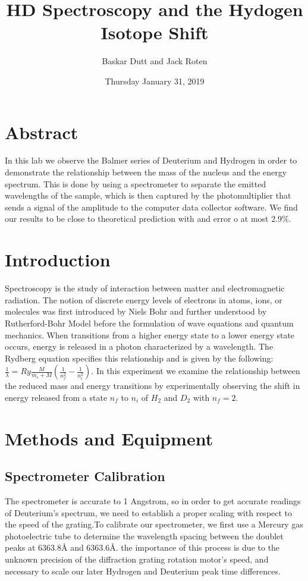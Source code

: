 \documentclass{article}
\title{HD Spectroscopy and the Hydogen Isotope Shift}
\author{Baskar Dutt and Jack Roten}
\date{Thursday January 31, 2019}
\begin{document}
\maketitle

\section{Abstract}

In this lab we observe the Balmer series of Deuterium and Hydrogen in order to demonstrate the relationship between the mass of the nucleus and the energy spectrum. This is done by using a spectrometer to separate the emitted wavelengths of the sample, which is then captured by the photomultiplier that sends a signal of the amplitude to the computer data collector software. We find our results to be close to theoretical prediction with and error o at most 2.9\%.



\section{Introduction}

Spectroscopy is the study of interaction between matter and electromagnetic radiation.  The notion of discrete energy levels of electrons in atoms, ions, or molecules was first introduced by Niels Bohr and further understood by Rutherford-Bohr Model before the formulation of wave equations and quantum mechanics.  When transitions from a higher energy state to a lower energy state occurs, energy is released in a photon characterized by a wavelength.  The Rydberg equation specifies this relationship and is given by the following: $\frac{1}{\lambda} = Ry\frac{M}{m_e+M}(\frac{1}{n_f^2}-\frac{1}{n_i^2})$. In this experiment we examine the relationship between the reduced mass and energy transitions by experimentally observing the shift in energy released from a state $n_f$ to $n_i$  of $H_2$ and $D_2$ with $n_f = 2$. 
\section{Methods and Equipment}
\subsection{Spectrometer Calibration}

The spectrometer is accurate to 1 Angstrom, so in order to get accurate readings of Deuterium's spectrum, we need to establish a proper scaling with respect to the speed of the grating.To calibrate our spectrometer, we first use a Mercury gas photoelectric tube to determine the wavelength spacing between the doublet peaks at 6363.8{\AA} and 6363.6{\AA}. the importance of this process is due to the unknown precision of the diffraction grating rotation motor's speed, and necessary to scale our later Hydrogen and Deuterium peak time differences.  
\end{document}
